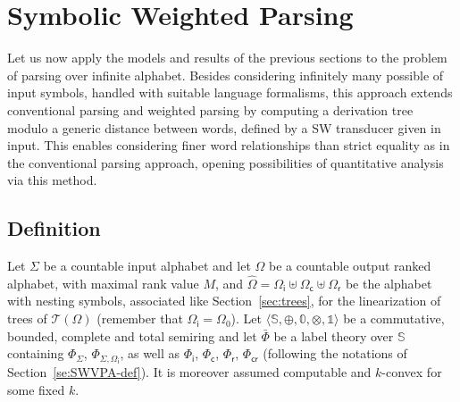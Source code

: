\documentclass[runningheads]{llncs}
\def\<#1>{\langle #1 \rangle}
\newcommand{\T}{\mathcal{T}}
\newcommand{\Semiring}{\mathbb{S}}
\newcommand{\zero}{\mathbb{0}}
\newcommand{\one}{\mathbb{1}}
\def\Omegai{{\Omega_\mathsf{i}}}
\def\Omegac{{\Omega_\mathsf{c}}}
\def\Omegar{{\Omega_\mathsf{r}}}
\def\Phii{{\Phi_\mathsf{i}}}
\def\Phic{{\Phi_\mathsf{c}}}
\def\Phir{{\Phi_\mathsf{r}}}
\def\Phicr{{\Phi_\mathsf{cr}}}
\begin{document}
\section{Symbolic Weighted Parsing}
\label{sec:parsing}
Let us now apply the models and results of the previous sections %
to the problem of parsing over infinite alphabet. %
%
Besides considering infinitely many possible of input symbols, 
handled with suitable language formalisms, 
this approach extends conventional parsing and weighted parsing
by computing a derivation tree modulo 
a generic distance between words,  
defined by a SW transducer given in input.
This enables considering finer word relationships than strict equality 
as in the conventional parsing approach, 
opening possibilities of quantitative analysis via this method.

\subsection{Definition}

Let $\Sigma$ be a countable input alphabet 
and let $\Omega$ be a countable output ranked alphabet, 
with maximal rank value $M$, 
and $\hat\Omega = \Omegai \uplus \Omegac \uplus \Omegar$
be the alphabet with nesting symbols, associated like Section~\ref{sec:trees}, 
for the linearization of trees of $\T(\Omega)$
(remember that $\Omegai = \Omega_0$).
%
Let $\< \Semiring, \oplus, \zero, \otimes, \one>$ be a commutative, bounded, complete 
and total semiring 
and let $\bar\Phi$ be a label theory over $\Semiring$
containing
$\Phi_\Sigma$, $\Phi_{\Sigma, \Omegai}$, as well as
$\Phii$, $\Phic$, $\Phir$, $\Phicr$
(following the notations of Section~\ref{se:SWVPA-def}).
It is moreover assumed computable and $k$-convex for some fixed $k$.
\end{document}
